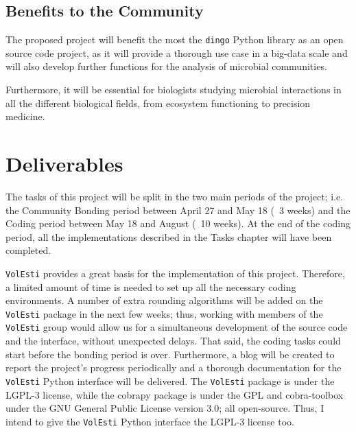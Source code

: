\documentclass{article}
\begin{document}
\subsection{Benefits to the Community}

The proposed project will benefit the most the \texttt{dingo} Python library 
as an open source code project, as it will provide a thorough use case in a big-data scale and 
will also develop further functions for the analysis of microbial communities. 

Furthermore, it will be essential for biologists studying microbial interactions in all the different biological fields, from ecosystem functioning to precision medicine. 


\section{Deliverables}


The tasks of this project will be split in the two main periods of the project; i.e. the Community Bonding period between April 27 and May 18 (~3 weeks) and the Coding period between May 18 and August (~10 weeks). 
At the end of the coding period, all the implementations described in the Tasks chapter will have been completed. 

\texttt{VolEsti} provides a great basis for the implementation of this project. 
Therefore, a limited amount of time is needed  to set up all the necessary coding environments. 
A number of extra rounding algorithms will be added on the \texttt{VolEsti} package in the next few weeks; thus, working with members of the \texttt{VolEsti} group would allow us for a simultaneous  development of the source code and the interface, without unexpected delays. That said, the coding tasks could start before the bonding period is over. 
Furthermore, a blog will be created to report the project’s progress periodically and a thorough documentation for the \texttt{VolEsti} Python interface will be delivered. The \texttt{VolEsti} package is under the LGPL-3 license, while the cobrapy package is under the GPL and cobra-toolbox under the GNU General Public License version 3.0; all open-source. Thus, I intend to give the  \texttt{VolEsti} Python interface the LGPL-3 license too. 
\end{document}
